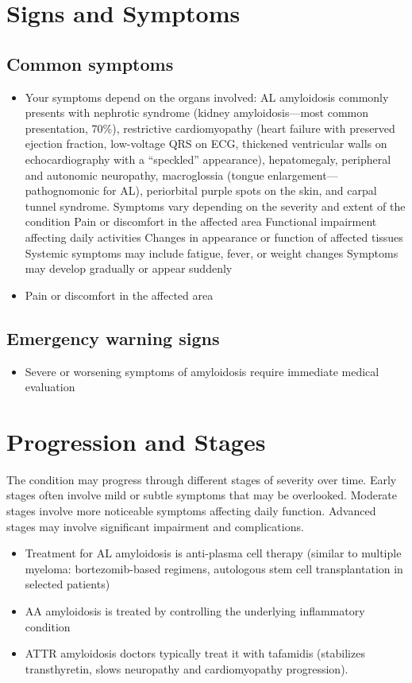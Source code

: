 \section{Signs and Symptoms}

\subsection{Common symptoms}
\begin{itemize}[noitemsep]
  \item Your symptoms depend on the organs involved: AL amyloidosis commonly presents with nephrotic syndrome (kidney amyloidosis---most common presentation, 70\%), restrictive cardiomyopathy (heart failure with preserved ejection fraction, low-voltage QRS on ECG, thickened ventricular walls on echocardiography with a ``speckled'' appearance), hepatomegaly, peripheral and autonomic neuropathy, macroglossia (tongue enlargement---pathognomonic for AL), periorbital purple spots on the skin, and carpal tunnel syndrome. Symptoms vary depending on the severity and extent of the condition Pain or discomfort in the affected area Functional impairment affecting daily activities Changes in appearance or function of affected tissues Systemic symptoms may include fatigue, fever, or weight changes Symptoms may develop gradually or appear suddenly
  \item Pain or discomfort in the affected area
  \end{itemize}

\subsection{Emergency warning signs}
\begin{itemize}[noitemsep]
  \item Severe or worsening symptoms of amyloidosis require immediate medical evaluation
\end{itemize}
\section{Progression and Stages}
The condition may progress through different stages of severity over time. Early stages often involve mild or subtle symptoms that may be overlooked. Moderate stages involve more noticeable symptoms affecting daily function. Advanced stages may involve significant impairment and complications.

\begin{itemize}[noitemsep]
  \item Treatment for AL amyloidosis is anti-plasma cell therapy (similar to multiple myeloma: bortezomib-based regimens, autologous stem cell transplantation in selected patients)
  \item AA amyloidosis is treated by controlling the underlying inflammatory condition
  \item ATTR amyloidosis doctors typically treat it with tafamidis (stabilizes transthyretin, slows neuropathy and cardiomyopathy progression).
\end{itemize}
